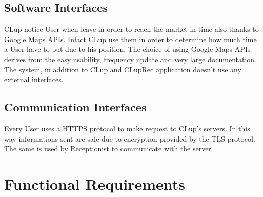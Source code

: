 \subsection{Software Interfaces}
CLup notice User when leave in order to reach the market in time also thanks to Google Maps APIs. Infact CLup use them in order to determine how much time a User have to put due to his position.
The choice of using Google Maps APIs derives from the easy usability, frequency update and very large documentation.
The system, in addition to CLup and CLupRec application doesn't use any external interfaces.


\subsection{Communication Interfaces}
Every User uses a HTTPS protocol to make request to CLup's servers. In this way informations sent are safe due to encryption provided by the TLS protocol. The same is used by Receptionist to communicate with the server.
\section{Functional Requirements}





